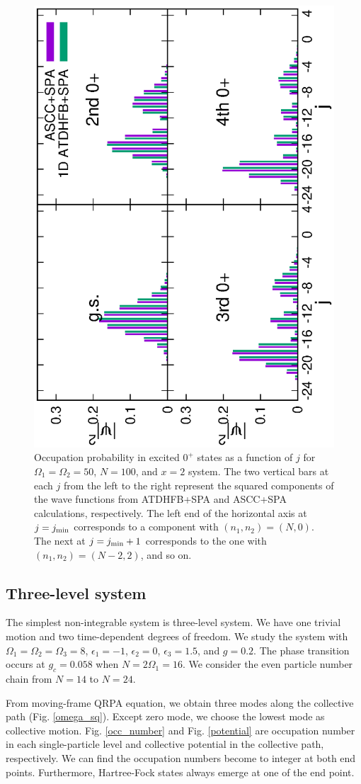\documentclass[%
superscriptaddress,
showpacs,
nofootinbib,
amsmath,amssymb,
aps,
prc,
twocolumn,
floatfix ]%
{revtex4-1}
\begin{document}
\begin{figure}[thb]
 \begin{center}
   \includegraphics[height=0.5\textwidth,angle=-90]{N100Xeq2occ.eps}
 \end{center}
	\caption{Occupation probability in excited $0^+$ states
as a function of $j$ for $\Omega_1=\Omega_2=50$, $N=100$, and $x=2$ system.
The two vertical bars at each $j$ from the left to the right represent
the squared components of the wave functions
from ATDHFB+SPA and ASCC+SPA calculations, respectively.
The left end of the horizontal axis at $j=j_{\rm min}$
corresponds to a component with $(n_1,n_2)=(N,0)$.
The next at $j=j_{\rm min}+1$ corresponds to the one with
$(n_1,n_2)=(N-2,2)$, and so on.
}
 \label{fig:N100_occ}
\end{figure}


\subsection{Three-level system}
The simplest non-integrable system is three-level system. We have one trivial motion and two time-dependent degrees of freedom. We study the system with $\Omega_1=\Omega_2=\Omega_3=8$, $\epsilon_1=-1$, $\epsilon_2=0$, $\epsilon_3=1.5$, and $g=0.2$. The phase transition occurs at $g_c=0.058$ when $N=2\Omega_1=16$. We consider the even particle number chain from $N=14$ to $N=24$. 

From moving-frame QRPA equation, we obtain three modes along the collective path (Fig. \ref{omega_sq}). Except zero mode, we choose the lowest mode as collective motion. Fig. \ref{occ_number} and Fig. \ref{potential} are occupation number in each single-particle level and collective potential in the collective path, respectively. We can find the occupation numbers become to integer at both end points. Furthermore, Hartree-Fock states always emerge at one of the end point. 
\end{document}
